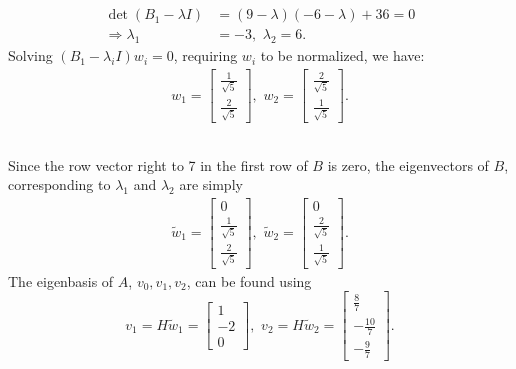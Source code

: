 \documentclass[11pt]{article}
\begin{document}
\subsection{}
\begin{equation}\begin{split} 
\det(B_1-\lambda I) &= (9-\lambda)(-6-\lambda) + 36 = 0 \\
\Longrightarrow \lambda_1 &= -3,\,\,\lambda_2 = 6.
\end{split}\nonumber\end{equation} 
Solving $(B_1-\lambda_iI)w_i=0$, requiring $w_i$ to be normalized, we have:
\begin{equation}\begin{split} 
w_1 = \begin{bmatrix} \frac1{\sqrt{5}} \\ \frac2{\sqrt{5}}\end{bmatrix},\,\,
w_2 = \begin{bmatrix} \frac2{\sqrt{5}} \\ \frac1{\sqrt{5}}\end{bmatrix}. 
\end{split}\nonumber\end{equation} 

\subsection{}
Since the row vector right to 7 in the first row of $B$ is zero, the eigenvectors of $B$, corresponding to $\lambda_1$ and $\lambda_2$ are simply
\begin{equation}\begin{split} 
\tilde w_1 = \begin{bmatrix}0 \\ \frac1{\sqrt{5}} \\ \frac2{\sqrt{5}} \end{bmatrix},\,\,\tilde w_2 = \begin{bmatrix} 0 \\ \frac2{\sqrt{5}} \\ \frac1{\sqrt{5}} \end{bmatrix}.
\end{split}\nonumber\end{equation} 
The eigenbasis of $A$, ${v_0,v_1, v_2}$, can be found using
$$v_1 = H\tilde w_1 = \begin{bmatrix} 1 \\ -2 \\ 0\end{bmatrix},\,\,v_2=H\tilde w_2 = \begin{bmatrix} \frac87\\ -\frac{10}7\\ -\frac97\end{bmatrix}.$$ 
\end{document}
